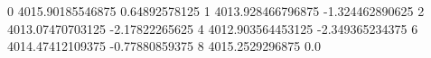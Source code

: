 0 4015.90185546875 0.64892578125
1 4013.928466796875 -1.324462890625
2 4013.07470703125 -2.17822265625
4 4012.903564453125 -2.349365234375
6 4014.47412109375 -0.77880859375
8 4015.2529296875 0.0
